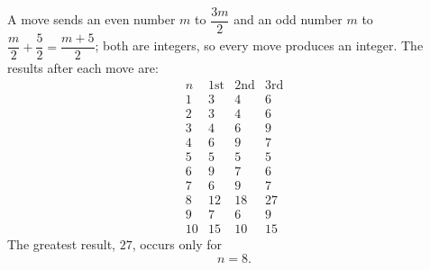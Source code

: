 A move sends an even number $m$ to $\dfrac{3m}{2}$ and an odd number $m$ to $\dfrac {m}{2}+\dfrac{5}{2}=\dfrac{m+5}{2}$; both are integers, so every move produces an integer. The results after each move are:
\[
\begin{array}{c|ccc}
n & \text{1st} & \text{2nd} & \text{3rd}\\\hline
1 & 3 & 4 & 6\\
2 & 3 & 4 & 6\\
3 & 4 & 6 & 9\\
4 & 6 & 9 & 7\\
5 & 5 & 5 & 5\\
6 & 9 & 7 & 6\\
7 & 6 & 9 & 7\\
8 & 12 & 18 & 27\\
9 & 7 & 6 & 9\\
10 & 15 & 10 & 15
\end{array}
\]
The greatest result, $27$, occurs only for
\[\boxed{n=8}.\]
